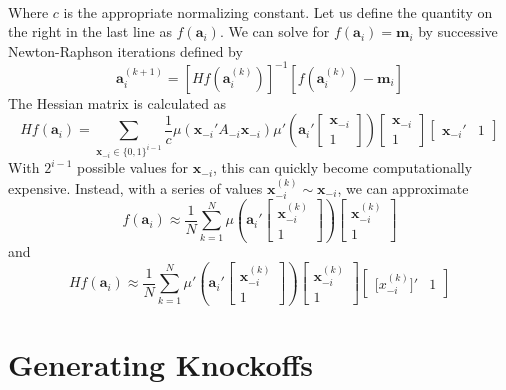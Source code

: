 \documentclass[11pt]{article}
\theoremstyle{definition}
\begin{document}
\begin{enumerate}
\begin{align*}
        \end{align*}
        Where $c$ is the appropriate normalizing constant. Let us define the quantity on the right in the last line as $f(\mathbf a_i)$. We can solve for $f(\mathbf a_i)=\mathbf{m}_i$ by successive Newton-Raphson iterations defined by 
        \[\mathbf a_i^{(k+1)} = \left[H f\left(\mathbf a_i^{(k)}\right)\right]^{-1}\left[f\left(\mathbf a_i^{(k)}\right)-\mathbf m_i\right] \]
        The Hessian matrix is calculated as 
    \[ H f\left(\mathbf a_i\right) = \sum_{\mathbf x_{-i} \in \{0,1\}^{i-1}} \frac{1}{c}\mu \left(\mathbf x_{-i}'A_{-i}\mathbf x_{-i}\right) \mu'\left(\mathbf{a}_i'\left[\begin{array}{c} \mathbf x_{-i} \\ 1 \end{array}\right]\right)\left[\begin{array}{c} \mathbf x_{-i} \\ 1 \end{array}\right]\left[\begin{array}{cc} \mathbf x_{-i}' & 1 \end{array}\right] \]
        With $2^{i-1}$ possible values for $\mathbf x_{-i}$, this can quickly become computationally expensive. Instead, with a series of values $\mathbf x_{-i}^{(k)}\sim \mathbf x_{-i}$, we can approximate
        \[f\left(\mathbf a_i\right) \approx \frac{1}{N}\sum_{k=1}^N \mu\left(\mathbf{a}_i'\left[\begin{array}{c} \mathbf x_{-i}^{(k)} \\ 1 \end{array}\right]\right)\left[\begin{array}{c} \mathbf x_{-i}^{(k)} \\ 1 \end{array}\right] \]
        and
        \[H f\left(\mathbf a_i\right) \approx \frac{1}{N}\sum_{k=1}^N \mu'\left(\mathbf{a}_i'\left[\begin{array}{c} \mathbf x_{-i}^{(k)} \\ 1 \end{array}\right]\right)\left[\begin{array}{c} \mathbf x_{-i}^{(k)} \\ 1 \end{array}\right]\left[\begin{array}{cc} \mathbf [x_{-i}^{(k)}]' & 1 \end{array}\right] \]

\end{enumerate}

\section{Generating Knockoffs}
\end{document}
